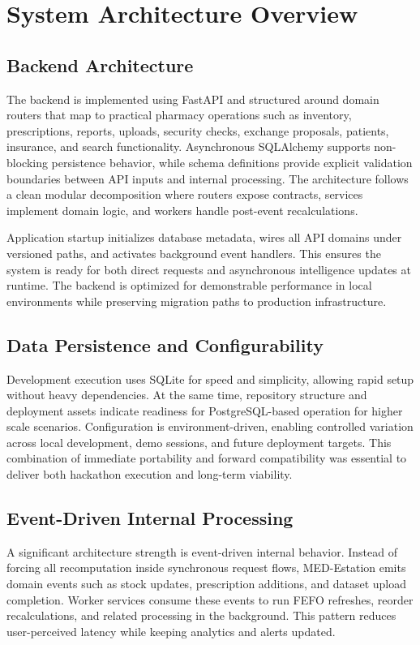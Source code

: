 \documentclass[12pt,a4paper]{article}
\begin{document}
\section{System Architecture Overview}
\subsection{Backend Architecture}
The backend is implemented using FastAPI and structured around domain routers that map to practical pharmacy operations such as inventory, prescriptions, reports, uploads, security checks, exchange proposals, patients, insurance, and search functionality. Asynchronous SQLAlchemy supports non-blocking persistence behavior, while schema definitions provide explicit validation boundaries between API inputs and internal processing. The architecture follows a clean modular decomposition where routers expose contracts, services implement domain logic, and workers handle post-event recalculations.

Application startup initializes database metadata, wires all API domains under versioned paths, and activates background event handlers. This ensures the system is ready for both direct requests and asynchronous intelligence updates at runtime. The backend is optimized for demonstrable performance in local environments while preserving migration paths to production infrastructure.

\subsection{Data Persistence and Configurability}
Development execution uses SQLite for speed and simplicity, allowing rapid setup without heavy dependencies. At the same time, repository structure and deployment assets indicate readiness for PostgreSQL-based operation for higher scale scenarios. Configuration is environment-driven, enabling controlled variation across local development, demo sessions, and future deployment targets. This combination of immediate portability and forward compatibility was essential to deliver both hackathon execution and long-term viability.

\subsection{Event-Driven Internal Processing}
A significant architecture strength is event-driven internal behavior. Instead of forcing all recomputation inside synchronous request flows, MED-Estation emits domain events such as stock updates, prescription additions, and dataset upload completion. Worker services consume these events to run FEFO refreshes, reorder recalculations, and related processing in the background. This pattern reduces user-perceived latency while keeping analytics and alerts updated.
\end{document}
